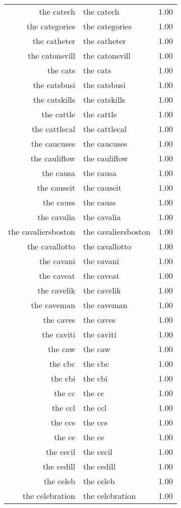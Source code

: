 \begin{table}[ht]
\begin{tabular}{rlr}
  the catech & the catech & 1.00 \\ 
  the categories & the categories & 1.00 \\ 
  the catheter & the catheter & 1.00 \\ 
  the catonsvill & the catonsvill & 1.00 \\ 
  the cats & the cats & 1.00 \\ 
  the catsbusi & the catsbusi & 1.00 \\ 
  the catskills & the catskills & 1.00 \\ 
  the cattle & the cattle & 1.00 \\ 
  the cattlecal & the cattlecal & 1.00 \\ 
  the caucuses & the caucuses & 1.00 \\ 
  the cauliflow & the cauliflow & 1.00 \\ 
  the causa & the causa & 1.00 \\ 
  the causeit & the causeit & 1.00 \\ 
  the causs & the causs & 1.00 \\ 
  the cavalia & the cavalia & 1.00 \\ 
  the cavaliersboston & the cavaliersboston & 1.00 \\ 
  the cavallotto & the cavallotto & 1.00 \\ 
  the cavani & the cavani & 1.00 \\ 
  the caveat & the caveat & 1.00 \\ 
  the cavelik & the cavelik & 1.00 \\ 
  the caveman & the caveman & 1.00 \\ 
  the caves & the caves & 1.00 \\ 
  the caviti & the caviti & 1.00 \\ 
  the caw & the caw & 1.00 \\ 
  the cbc & the cbc & 1.00 \\ 
  the cbi & the cbi & 1.00 \\ 
  the cc & the cc & 1.00 \\ 
  the ccl & the ccl & 1.00 \\ 
  the ccs & the ccs & 1.00 \\ 
  the ce & the ce & 1.00 \\ 
  the cecil & the cecil & 1.00 \\ 
  the cedill & the cedill & 1.00 \\ 
  the celeb & the celeb & 1.00 \\ 
  the celebration & the celebration & 1.00 \\ 

\end{tabular}
\end{table}
